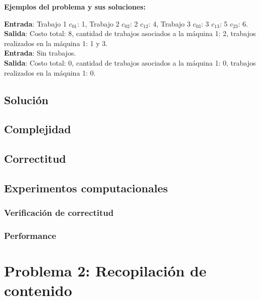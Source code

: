\documentclass[a4paper, 10pt, twoside]{article}
\begin{document}
\textbf{Ejemplos del problema y sus soluciones:}

\textbf{Entrada}: Trabajo 1 $c_{01}$: 1, Trabajo 2 $c_{02}$: 2 $c_{12}$: 4, Trabajo 3 $c_{03}$: 3 $c_{13}$: 5 $c_{23}$: 6. \\
\textbf{Salida}: Costo total: 8, cantidad de trabajos asociados a la máquina 1: 2, trabajos realizados en la máquina 1: 1 y 3. \\

\textbf{Entrada}: Sin trabajos. \\
\textbf{Salida}: Costo total: 0, cantidad de trabajos asociados a la máquina 1: 0, trabajos realizados en la máquina 1: 0. \\

\subsection{Solución}

\subsection{Complejidad}

\subsection{Correctitud}

\subsection{Experimentos computacionales}
\subsubsection{Verificación de correctitud}

\subsubsection{Performance}




\newpage

\section{Problema 2: Recopilación de contenido}
\end{document}

